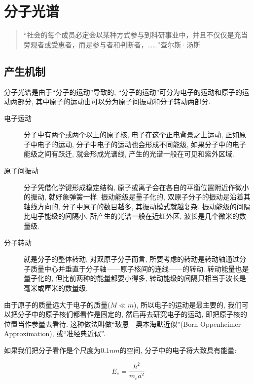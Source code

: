 \section{分子光谱}

\begin{quotation}
“社会的每个成员必定会以某种方式参与到科研事业中，并且不仅仅是充当旁观者或受惠者，而是参与者和判断者，……”\qquad 查尔斯·汤斯
\end{quotation}

\subsection{产生机制}

分子光谱是由于``分子的运动''导致的,
``分子的运动''可分为电子的运动和原子的运动两部分,
其中原子的运动由可以分为原子间振动和分子转动两部分.


\begin{description}
  \item[电子运动] 分子中有两个或两个以上的原子核,
  电子在这个正电背景之上运动, 正如原子中电子的运动,
  分子中电子的运动也会形成不同能级, 如果分子中的电子能级之间有跃迁,
  就会形成光谱线, 产生的光谱一般在可见和紫外区域.

  \item[原子间振动] 分子凭借化学键形成稳定结构,
  原子或离子会在各自的平衡位置附近作微小的振动, 就好象弹簧一样.
  振动能级是量子化的, 双原子分子的振动是沿着其轴线方向的,
  分子中原子的数目越多, 其振动模式就越复杂.
  振动能级的间隔比电子能级的间隔小, 所产生的光谱一般在近红外区,
  波长是几个微米的数量级.

  \item[分子转动] 就是分子的整体转动, 对双原子分子而言,
  所要考虑的转动是转动轴通过分子质量中心并垂直于分子轴——原子核间的连线——的转动.
  转动能量也是量子化的, 但比前两种的能量都要小得多,
  转动能级的间隔只相当于波长是毫米或厘米的数量级.
\end{description}


由于原子的质量远大于电子的质量($M \ll m$), 所以电子的运动是最主要的,
我们可以把分子中的原子核们都看作是固定的, 然后再去研究电子的运动,
即把原子核的位置当作参量去看待.
这种做法叫做``玻恩---奥本海默近似''(Born-Oppenheimer Approximation),
或``准经典近似''.

如果我们把分子看作是个尺度为$0.1nm$的空间,
分子中的电子将大致具有能量:

\begin{equation}\label{energy of electron in molecule}
E_e = \frac{\hbar^2}{m_e a^2}
\end{equation}

